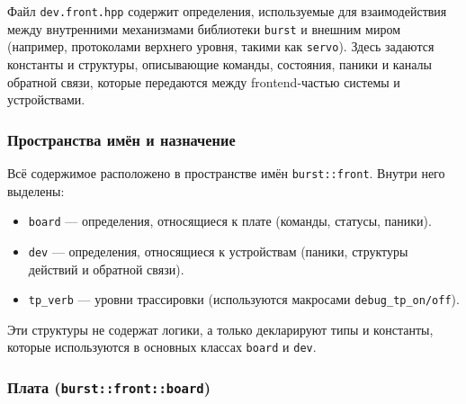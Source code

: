 \documentclass[a4paper,12pt]{article}
\begin{document}
Файл \texttt{dev.front.hpp} содержит определения, используемые для взаимодействия между внутренними механизмами библиотеки \texttt{burst} и внешним миром (например, протоколами верхнего уровня, такими как \texttt{servo}). Здесь задаются константы и структуры, описывающие команды, состояния, паники и каналы обратной связи, которые передаются между frontend-частью системы и устройствами.

\subsubsection{Пространства имён и назначение}

Всё содержимое расположено в пространстве имён \texttt{burst::front}. Внутри него выделены:

\begin{itemize}
    \item \texttt{board} — определения, относящиеся к плате (команды, статусы, паники).
    \item \texttt{dev} — определения, относящиеся к устройствам (паники, структуры действий и обратной связи).
    \item \texttt{tp\_verb} — уровни трассировки (используются макросами \texttt{debug\_tp\_on/off}).
\end{itemize}

Эти структуры не содержат логики, а только декларируют типы и константы, которые используются в основных классах \texttt{board} и \texttt{dev}.

\subsubsection{Плата (\texttt{burst::front::board})}
\end{document}
